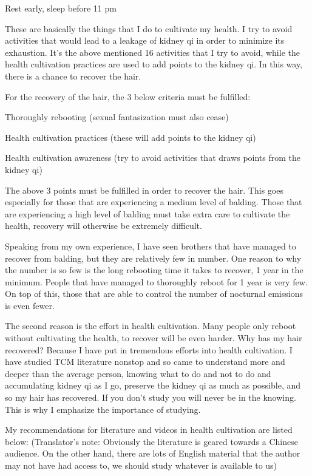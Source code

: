 \documentclass[
]{book}
\begin{document}
Rest early, sleep before 11 pm

These are basically the things that I do to cultivate my health. I try to avoid activities that would lead to a leakage of kidney qi in order to minimize its exhaustion. It's the above mentioned 16 activities that I try to avoid, while the health cultivation practices are used to add points to the kidney qi. In this way, there is a chance to recover the hair.

For the recovery of the hair, the 3 below criteria must be fulfilled:

Thoroughly rebooting (sexual fantasization must also cease)

Health cultivation practices (these will add points to the kidney qi)

Health cultivation awareness (try to avoid activities that draws points from the kidney qi)

The above 3 points must be fulfilled in order to recover the hair. This goes especially for those that are experiencing a medium level of balding. Those that are experiencing a high level of balding must take extra care to cultivate the health, recovery will otherwise be extremely difficult.

Speaking from my own experience, I have seen brothers that have managed to recover from balding, but they are relatively few in number. One reason to why the number is so few is the long rebooting time it takes to recover, 1 year in the minimum. People that have managed to thoroughly reboot for 1 year is very few. On top of this, those that are able to control the number of nocturnal emissions is even fewer.

The second reason is the effort in health cultivation. Many people only reboot without cultivating the health, to recover will be even harder. Why has my hair recovered? Because I have put in tremendous efforts into health cultivation. I have studied TCM literature nonstop and so came to understand more and deeper than the average person, knowing what to do and not to do and accumulating kidney qi as I go, preserve the kidney qi as much as possible, and so my hair has recovered. If you don't study you will never be in the knowing. This is why I emphasize the importance of studying.

My recommendations for literature and videos in health cultivation are listed below:
(Translator's note: Obviously the literature is geared towards a Chinese audience. On the other hand, there are lots of English material that the author may not have had access to, we should study whatever is available to us)
\end{document}
